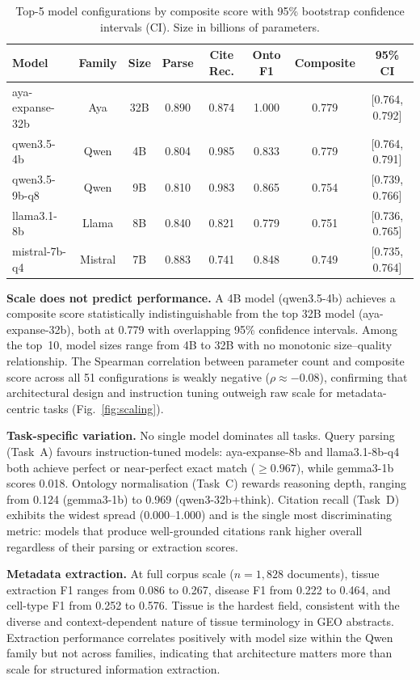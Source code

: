 \documentclass[sn-nature]{sn-jnl}
\begin{document}
\begin{table}[t]
\caption{Top-5 model configurations by composite score with 95\% bootstrap
  confidence intervals (CI). Size in billions of parameters.}\label{tab:top5}
\begin{tabular}{lccccccc}
\toprule
Model & Family & Size & Parse & Cite Rec. & Onto F1 & Composite & 95\% CI \\
\midrule
aya-expanse-32b  & Aya     & 32B & 0.890 & 0.874 & 1.000 & 0.779 & {[}0.764, 0.792{]} \\
qwen3.5-4b       & Qwen    & 4B  & 0.804 & 0.985 & 0.833 & 0.779 & {[}0.764, 0.791{]} \\
qwen3.5-9b-q8    & Qwen    & 9B  & 0.810 & 0.983 & 0.865 & 0.754 & {[}0.739, 0.766{]} \\
llama3.1-8b      & Llama   & 8B  & 0.840 & 0.821 & 0.779 & 0.751 & {[}0.736, 0.765{]} \\
mistral-7b-q4    & Mistral & 7B  & 0.883 & 0.741 & 0.848 & 0.749 & {[}0.735, 0.764{]} \\
\bottomrule
\end{tabular}
\end{table}

\textbf{Scale does not predict performance.} A 4B model (qwen3.5-4b)
achieves a composite score statistically indistinguishable from the top 32B
model (aya-expanse-32b), both at 0.779 with overlapping 95\% confidence
intervals. Among the top~10, model sizes range from 4B to 32B with no
monotonic size--quality relationship. The Spearman correlation between
parameter count and composite score across all 51 configurations is weakly
negative ($\rho \approx -0.08$), confirming that architectural design and
instruction tuning outweigh raw scale for metadata-centric tasks
(Fig.~\ref{fig:scaling}).

\textbf{Task-specific variation.} No single model dominates all tasks.
Query parsing (Task~A) favours instruction-tuned models: aya-expanse-8b and
llama3.1-8b-q4 both achieve perfect or near-perfect exact match ($\geq
0.967$), while gemma3-1b scores 0.018. Ontology normalisation (Task~C)
rewards reasoning depth, ranging from 0.124 (gemma3-1b) to 0.969
(qwen3-32b+think). Citation recall (Task~D) exhibits the widest spread
(0.000--1.000) and is the single most discriminating metric: models that
produce well-grounded citations rank higher overall regardless of their
parsing or extraction scores.

\textbf{Metadata extraction.} At full corpus scale ($n = 1{,}828$
documents), tissue extraction F1 ranges from 0.086 to 0.267, disease F1
from 0.222 to 0.464, and cell-type F1 from 0.252 to 0.576. Tissue is the
hardest field, consistent with the diverse and context-dependent nature of
tissue terminology in GEO abstracts. Extraction performance correlates
positively with model size within the Qwen family but not across families,
indicating that architecture matters more than scale for structured
information extraction.
\end{document}
